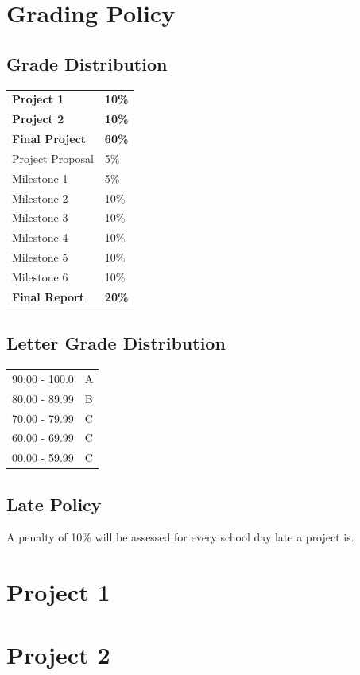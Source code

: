 \documentclass[11pt]{article}
\newcommand\tab[1][.5in]{\hspace*{#1}}
\begin{document}
\newpage
\section{Grading Policy}
\subsection{Grade Distribution}
\begin{tabular}{ll}
    \textbf{Project 1} & \textbf{10\%} \\
    \textbf{Project 2} & \textbf{10\%} \\
    \textbf{Final Project} & \textbf{60\%} \\
    \tab Project Proposal & 5\% \\
    \tab Milestone 1 & 5\% \\
    \tab Milestone 2 & 10\% \\
    \tab Milestone 3 & 10\% \\
    \tab Milestone 4 & 10\% \\
    \tab Milestone 5 & 10\% \\
    \tab Milestone 6 & 10\% \\
    \textbf{Final Report} & \textbf{20\%}
\end{tabular}

\subsection{Letter Grade Distribution}
\begin{tabular}{ll}
    90.00 - 100.0 & A \\
    80.00 - 89.99 & B \\
    70.00 - 79.99 & C \\
    60.00 - 69.99 & C \\
    00.00 - 59.99 & C
\end{tabular}

\subsection{Late Policy}
A penalty of 10\% will be assessed for every school day late a project is.

\section{Project 1}
\section{Project 2}
\end{document}
